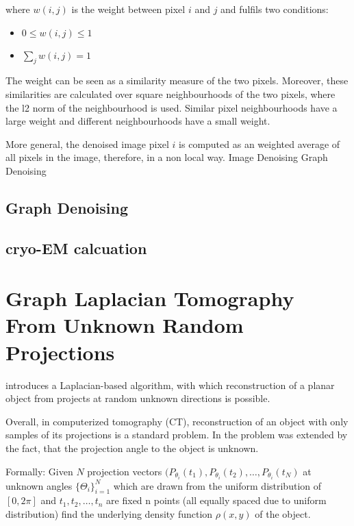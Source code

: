 where $w(i,j)$ is the weight between pixel $i$ and $j$ and fulfils two conditions:
\begin{itemize}
    \item $0 \le w(i,j) \le 1$
    \item $\sum_j{w(i,j) = 1}$
\end{itemize}

The weight can be seen as a similarity measure of the two pixels.
Moreover, these similarities are calculated over square neighbourhoods of the two pixels,
where the l2 norm of the neighbourhood is used.
Similar pixel neighbourhoods have a large weight and different neighbourhoods have a small weight.

More general, the denoised image pixel $i$ is computed as an weighted average of all pixels in the 
image, therefore, in a non local way.
Image Denoising
Graph Denoising

\subsection{Graph Denoising}

\cite{noneLocalMean}
\cite{learningToDrop}


\subsection{cryo-EM calcuation}

\section{Graph Laplacian Tomography From Unknown Random Projections}

\citet{LaplaceRandomProjections} introduces a Laplacian-based algorithm, with which 
reconstruction of a planar object from projects at random unknown directions is possible.

Overall, in computerized tomography (CT), reconstruction of an object with only samples of its projections
is a standard problem. In \citet{LaplaceRandomProjections} the problem was extended by the fact,
that the projection angle to the object is unknown.

Formally:
Given $N$ projection vectors $( P_{\theta_i}(t_1), P_{\theta_i}(t_2), \dots, P_{\theta_i}(t_N)$ 
at unknown angles $\{\Theta_i\}^N_{i=1}$ which are drawn from the uniform distribution of $[0, 2\pi]$
and $t_1, t_2, \dots, t_n$ are fixed n points (all equally spaced due to uniform distribution) 
find the underlying density function $\rho (x,y)$ of the object.

